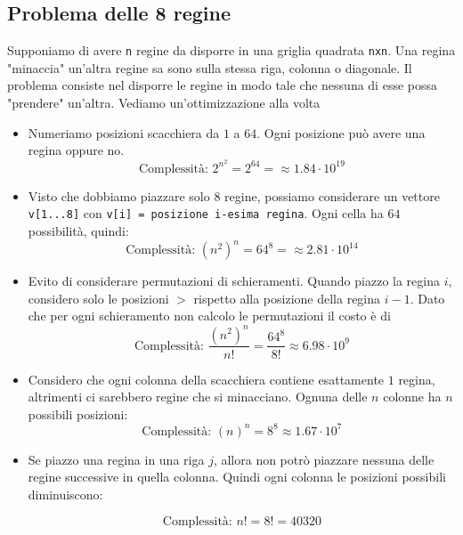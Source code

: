 \subsection{Problema delle 8 regine}
Supponiamo di avere \verb|n| regine da disporre in una griglia quadrata \verb|nxn|. Una regina "minaccia" un'altra regine sa sono sulla stessa riga, colonna o diagonale. Il problema consiste nel disporre le regine in modo tale che nessuna di esse possa "prendere" un'altra. Vediamo un'ottimizzazione alla volta
\begin{itemize}
	\item Numeriamo posizioni scacchiera da $ 1 $ a $ 64 $. Ogni posizione può avere una regina oppure no.
	      \[
		      \text{Complessità: } 2^{n^2} = 2^{64} = \approx 1.84 \cdot 10^{19}
	      \]
	\item Visto che dobbiamo piazzare solo $ 8 $ regine, possiamo considerare un vettore \verb|v[1...8]| con \verb|v[i] = posizione i-esima regina|. Ogni cella ha $ 64 $ possibilità, quindi:
	      \[
		      \text{Complessità: } \left(n^2 \right)^{n} = 64^{8} = \approx 2.81 \cdot 10^{14}
	      \]
	\item Evito di considerare permutazioni di schieramenti. Quando piazzo la regina $ i $, considero solo le posizioni $ > $ rispetto alla posizione della regina $ i-1 $. Dato che per ogni schieramento non calcolo le permutazioni il costo è di
	      \[
		      \text{Complessità: } \frac{\left(n^2 \right)^{n}}{n!} = \frac{64^{8}}{8!} \approx 6.98 \cdot 10^{9}
	      \]
	\item Considero che ogni colonna della scacchiera contiene esattamente $ 1 $ regina, altrimenti ci sarebbero regine che si minacciano. Ognuna delle $ n $ colonne ha $ n $ possibili posizioni:
	      \[
		      \text{Complessità: } \left(n \right)^{n} =8^8 \approx 1.67 \cdot  10^7
	      \]
	\item Se piazzo una regina in una riga $ j $, allora non potrò piazzare nessuna delle regine successive in quella colonna. Quindi ogni colonna le posizioni possibili diminuiscono:

	      \[
		      \text{Complessità: } n! = 8! = 40320
	      \]

\end{itemize}
